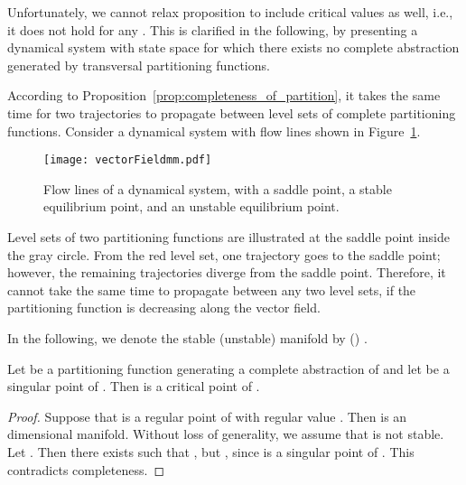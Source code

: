 Unfortunately, we cannot relax proposition to include critical values as well, i.e., it does not hold for any . This is clarified in the following, by presenting a dynamical system with state space  for which there exists no complete abstraction generated by transversal partitioning functions.

According to Proposition~\ref{prop:completeness_of_partition}, it takes the same time for two trajectories to propagate between level sets of complete partitioning functions. Consider a dynamical system with flow lines shown in Figure~\ref{fig:vectorFieldmm}.
\begin{figure}[!htb]
    \centering
       \texttt{[image: vectorFieldmm.pdf]}
    \caption{Flow lines of a dynamical system, with a saddle point, a stable equilibrium point, and an unstable equilibrium point.\label{fig:vectorFieldmm}}
\end{figure}
Level sets of two partitioning functions are illustrated at the saddle point inside the gray circle. From the red level set, one trajectory goes to the saddle point; however, the remaining trajectories diverge from the saddle point. Therefore, it cannot take the same time to propagate between any two level sets, if the partitioning function is decreasing along the vector field.








In the following, we denote the stable (unstable) manifold by  () \cite{hirsch}.
\begin{lemma}\label{lem:crit}
Let  be a partitioning function generating a complete abstraction of \dynSysAll and let  be a singular point of \vectField. Then  is a critical point of .
\end{lemma}
\begin{proof}
Suppose that  is a regular point of  with regular value . Then  is an  dimensional manifold. Without loss of generality, we assume that  is not stable. Let . Then there exists  such that  , but , since  is a singular point of . This contradicts completeness.
\end{proof}

